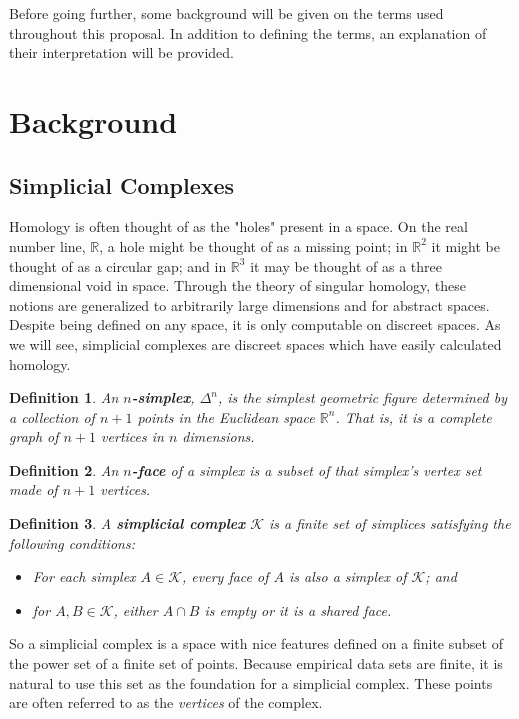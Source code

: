 \documentclass[letterpaper, 10 pt, conference]{ieeeconf}  %
\newtheorem{defn}{Definition}
\newcommand{\Rone}{\mathbb{R}}
\newcommand{\Rtwo}{\mathbb{R}^{2}}
\newcommand{\Rthree}{\mathbb{R}^{3}}
\newenvironment{myitemize}
{ \begin{itemize}
    \setlength{\itemsep}{0pt}
    \setlength{\parskip}{0pt}
    \setlength{\parsep}{0pt}     }
{ \end{itemize}                  }
\begin{document}
Before going further, some background will be given on the terms used throughout this proposal. In addition to defining the terms, an explanation of their interpretation will be provided.

\section{Background}
\label{sec.background}

\subsection{Simplicial Complexes}
\label{subsec.simcmplx}

Homology is often thought of as the "holes" present in a space. On the real number line, $\Rone$, a hole might be thought of as a missing point; in $\Rtwo$ it might be thought of as a circular gap; and in $\Rthree$ it may be thought of as a three dimensional void in space. Through the theory of singular homology, these notions are generalized to arbitrarily large dimensions and for abstract spaces. Despite being defined on any space, it is only computable on discreet spaces. As we will see, simplicial complexes are discreet spaces which have easily calculated homology.

\begin{defn}
An {\bf $n$-simplex}, $\Delta^n$, is the simplest geometric figure determined by a collection of $n+1$ points in the Euclidean space $\Rone ^n$. That is, it is a complete graph of $n+1$ vertices in $n$ dimensions.
\end{defn}
\begin{defn}
An {\bf $n$-face} of a simplex is a subset of that simplex's vertex set made of $n+1$ vertices.
\end{defn}
\begin{defn}
A {\bf simplicial complex} $\mathcal K$ is a  finite set of simplices satisfying the following conditions:
\begin{myitemize}
\item For each simplex $A\in\mathcal K$, every face of $A$ is also a simplex of $\mathcal K$; and
\item for $A,B\in \mathcal K$, either $A\cap B$ is empty or it is a shared face.
\end{myitemize}
\end{defn}

So a simplicial complex is a space with nice features defined on a finite subset of the power set of a finite set of points. Because empirical data sets are finite, it is natural to use this set as the foundation for a simplicial complex. These points are often referred to as the {\it vertices} of the complex.
\end{document}

